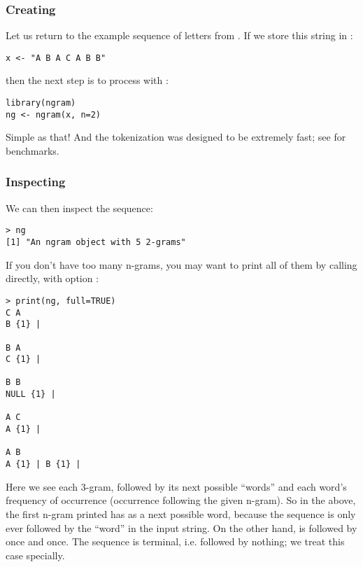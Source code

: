 \subsubsection{Creating}

Let us return to the example sequence of letters from .  If 
we store this string in :

\begin{lstlisting}[language=rr]
x <- "A B A C A B B"
\end{lstlisting}

then the next step is to process with :

\begin{lstlisting}[language=rr]
library(ngram)
ng <- ngram(x, n=2)
\end{lstlisting}

Simple as that!  And the tokenization was designed to be extremely fast; see 
 for benchmarks.



\subsubsection{Inspecting}

We can then inspect the sequence:

\begin{lstlisting}[language=inteRactive]
> ng
[1] "An ngram object with 5 2-grams"
\end{lstlisting}

If you don't have too many n-grams, you may want to print all of them by 
calling 
 directly, with option :
\begin{lstlisting}[language=inteRactive]
> print(ng, full=TRUE)
C A 
B {1} | 

B A 
C {1} | 

B B 
NULL {1} | 

A C 
A {1} | 

A B 
A {1} | B {1} | 
\end{lstlisting}

Here we see each 3-gram, followed by its next possible ``words'' and each 
word's frequency of occurrence (occurrence following the given n-gram).  So in 
the above, the first n-gram printed  has  as a next 
possible word, because the sequence  is only ever followed by the 
``word''  in the input string.  On the other hand,  is 
followed by  once and  once.  The sequence  is 
terminal, i.e. followed by nothing; we treat this case specially.



